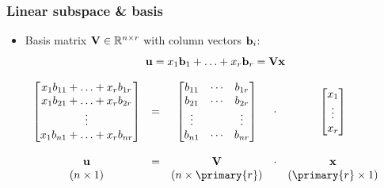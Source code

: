 \documentclass[t]{beamer} %
\begin{document}
\begin{frame}
  \frametitle{Linear subspace \& basis}
  
  \begin{itemize}
  \item Basis matrix $\mathbf{V} \in \mathbb{R}^{n\times r}$ with column vectors $\vb_i$:
    \[
    \vu = x_1 \vb_1 + \ldots + x_r \vb_r = \mathbf{V} \vx
    \]
  \end{itemize}

  \[
  \begin{array}{ccccc}
    \begin{bmatrix}
      x_1 b_{11} + \ldots + x_r b_{1r} \\
      x_1 b_{21} + \ldots + x_r b_{2r} \\
      \vdots\\
      x_1 b_{n1} + \ldots + x_r b_{nr}
    \end{bmatrix}
    & = &
    \begin{bmatrix}
      b_{11} & \cdots & b_{1r} \\
      b_{21} & \cdots & b_{2r} \\
      \vdots & & \vdots \\
      b_{n1} & \cdots & b_{nr}
    \end{bmatrix}
    & \cdot &
    \begin{bmatrix}
      x_1 \\
      \vdots \\
      x_r
    \end{bmatrix} \\
    \\
    \mathbf{u} & = & \mathbf{V} & \cdot & \mathbf{x} \\
    (n\times 1) & & (n\times \primary{r}) & & (\primary{r}\times 1)
  \end{array}
  \]

\end{frame}
\end{document}

